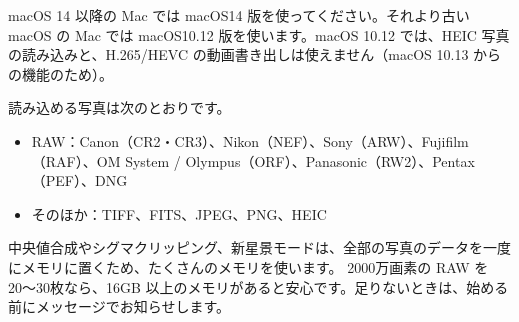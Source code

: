 \begin{memo}[どちらを選べばいい？]
macOS 14 以降の Mac では \textsf{macOS14} 版を使ってください。それより古い macOS の Mac では \textsf{macOS10.12} 版を使います。macOS 10.12 では、HEIC 写真の読み込みと、H.265/HEVC の動画書き出しは使えません（macOS 10.13 からの機能のため）。
\end{memo}

読み込める写真は次のとおりです。
\begin{itemize}[itemsep=0.2ex]
  \item RAW：Canon（CR2・CR3）、Nikon（NEF）、Sony（ARW）、Fujifilm（RAF）、OM System / Olympus（ORF）、Panasonic（RW2）、Pentax（PEF）、DNG
  \item そのほか：TIFF、FITS、JPEG、PNG、HEIC
\end{itemize}

\begin{hint}[メモリの目安]
中央値合成やシグマクリッピング、新星景モードは、全部の写真のデータを一度にメモリに置くため、たくさんのメモリを使います。
2000万画素の RAW を20〜30枚なら、16GB 以上のメモリがあると安心です。足りないときは、始める前にメッセージでお知らせします。
\end{hint}
